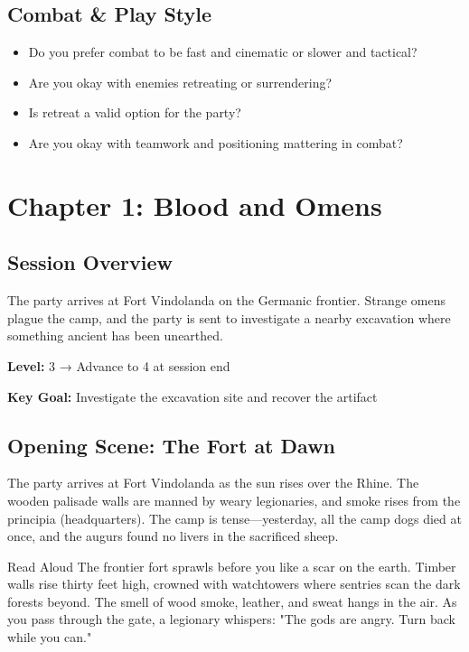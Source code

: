 \documentclass[letterpaper,oneside,twocolumn,openany]{dndbook}
\begin{document}
\section{Combat \& Play Style}
\begin{itemize}
\item Do you prefer combat to be fast and cinematic or slower and tactical?
\item Are you okay with enemies retreating or surrendering?
\item Is retreat a valid option for the party?
\item Are you okay with teamwork and positioning mattering in combat?
\end{itemize}

\chapter{Chapter 1: Blood and Omens}

\section{Session Overview}
The party arrives at Fort Vindolanda on the Germanic frontier. Strange omens plague the camp, and the party is sent to investigate a nearby excavation where something ancient has been unearthed.

\textbf{Level:} 3 → Advance to 4 at session end

\textbf{Key Goal:} Investigate the excavation site and recover the artifact

\section{Opening Scene: The Fort at Dawn}

The party arrives at Fort Vindolanda as the sun rises over the Rhine. The wooden palisade walls are manned by weary legionaries, and smoke rises from the principia (headquarters). The camp is tense—yesterday, all the camp dogs died at once, and the augurs found no livers in the sacrificed sheep.

\begin{paperbox}{Read Aloud}
The frontier fort sprawls before you like a scar on the earth. Timber walls rise thirty feet high, crowned with watchtowers where sentries scan the dark forests beyond. The smell of wood smoke, leather, and sweat hangs in the air. As you pass through the gate, a legionary whispers: "The gods are angry. Turn back while you can."
\end{paperbox}
\end{document}
